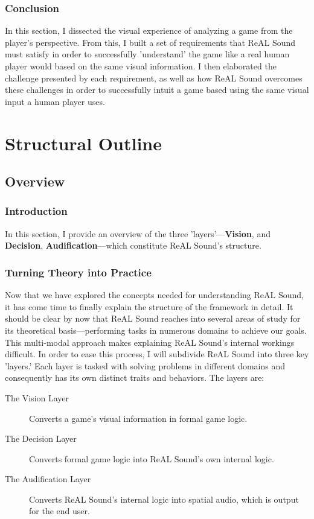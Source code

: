 \documentclass{report}
\newcommand{\rs}{ReAL Sound\xspace}
\newcommand{\vision}{\textbf{Vision}\xspace}
\newcommand{\decision}{\textbf{Decision}\xspace}
\newcommand{\audio}{\textbf{Audification}\xspace}
\begin{document}
\subsubsection{Conclusion}
In this section, I dissected the visual experience of analyzing a game from the player's perspective. From this, I built a set of requirements that \rs must satisfy in order to successfully 'understand' the game like a real human player would based on the same visual information. I then elaborated the challenge presented by each requirement, as well as how \rs overcomes these challenges in order to successfully intuit a game based using the same visual input a human player uses. 

\section{Structural Outline}

\subsection{Overview}

\subsubsection{Introduction}
In this section, I provide an overview of the three 'layers'---\vision, and \decision, \audio---which constitute \rs's structure. 

\subsubsection{Turning Theory into Practice}

Now that we have explored the concepts needed for understanding \rs, it has come time to finally explain the structure of the framework in detail. It should be clear by now that \rs reaches into several areas of study for its theoretical basis---performing tasks in numerous domains to achieve our goals. This multi-modal approach makes explaining \rs's internal workings difficult. In order to ease this process, I will subdivide \rs into three key 'layers.' Each layer is tasked with solving problems in different domains and consequently has its own distinct traits and behaviors. The layers are:

\begin{description}
    \item[The Vision Layer] Converts a game's visual information in formal game logic. 
    \item[The Decision Layer] Converts formal game logic into \rs's own internal logic.
    \item[The Audification Layer] Converts \rs's internal logic into spatial audio, which is output for the end user.
\end{description}
\end{document}
